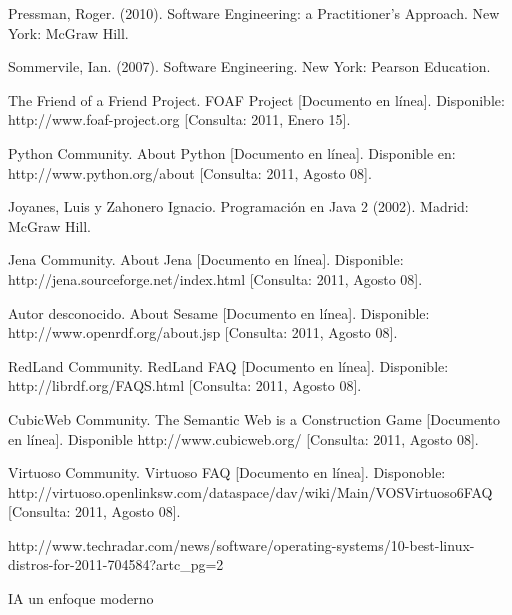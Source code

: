 \begin{thebibliography}{20}
 Pressman, Roger. (2010). Software Engineering: a Practitioner's Approach. New York: McGraw Hill.

 Sommervile, Ian. (2007). Software Engineering. New York: Pearson Education.

 The Friend of a Friend Project. FOAF Project [Documento en línea]. Disponible: http://www.foaf-project.org [Consulta: 2011, Enero 15].

 Python Community. About Python [Documento en línea]. Disponible en: http://www.python.org/about [Consulta: 2011, Agosto 08].

 Joyanes, Luis y Zahonero Ignacio. Programación en Java 2 (2002). Madrid: McGraw Hill.

 Jena Community. About Jena [Documento en línea]. Disponible: http://jena.sourceforge.net/index.html [Consulta: 2011, Agosto 08].

 Autor desconocido. About Sesame [Documento en línea]. Disponible: http://www.openrdf.org/about.jsp [Consulta: 2011, Agosto 08].

 RedLand Community. RedLand FAQ [Documento en línea]. Disponible: http://librdf.org/FAQS.html [Consulta: 2011, Agosto 08].

 CubicWeb Community. The Semantic Web is a Construction Game [Documento en línea]. Disponible http://www.cubicweb.org/ [Consulta: 2011, Agosto 08].

 Virtuoso Community. Virtuoso FAQ [Documento en línea]. Disponoble: http://virtuoso.openlinksw.com/dataspace/dav/wiki/Main/VOSVirtuoso6FAQ [Consulta: 2011, Agosto 08].


 http://www.techradar.com/news/software/operating-systems/10-best-linux-distros-for-2011-704584?artc\_pg=2

 IA un enfoque moderno

\end{thebibliography}
